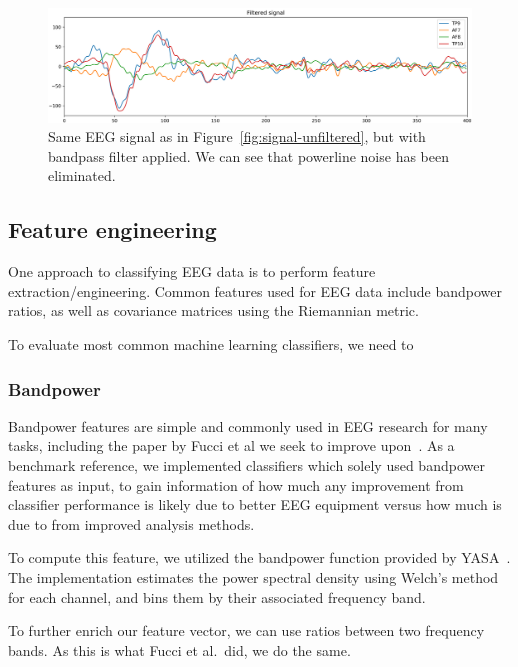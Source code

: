         \begin{figure}[h]
            \includegraphics[width=14cm]{img/raw-signal-postfilter.png}
            \caption{Same EEG signal as in Figure~\ref{fig:signal-unfiltered}, but with bandpass filter applied. We can see that powerline noise has been eliminated.}\label{fig:signal-filtered}
        \end{figure}

    \subsection{Feature engineering}

        One approach to classifying EEG data is to perform feature extraction/engineering. Common features used for EEG data include bandpower ratios, as well as covariance matrices using the Riemannian metric.

        To evaluate most common machine learning classifiers, we need to

        \subsubsection{Bandpower}


            Bandpower features are simple and commonly used in EEG research for many tasks, including the paper by Fucci et al we seek to improve upon~\cite{fucci_replication_2019}. As a benchmark reference, we implemented classifiers which solely used bandpower features as input, to gain information of how much any improvement from classifier performance is likely due to better EEG equipment versus how much is due to from improved analysis methods.

            To compute this feature, we utilized the bandpower function provided by YASA~\cite{vallat_yasa_2020}. The implementation estimates the power spectral density using Welch's method for each channel, and bins them by their associated frequency band.

            To further enrich our feature vector, we can use ratios between two frequency bands. As this is what Fucci et al.\ did, we do the same.

